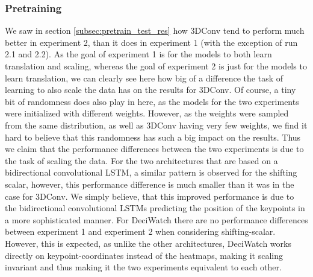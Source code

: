 \documentclass[./main.tex]{subfiles}
\begin{document}
\subsubsection{Pretraining}
We saw in section \ref{subsec:pretrain_test_res} how 3DConv tend to perform much better in experiment 2, than it does in experiment 1 (with the exception of run 2.1 and 2.2). As the goal of experiment 1 is for the models to both learn translation and scaling, whereas the goal of experiment 2 is just for the models to learn translation, we can clearly see here how big of a difference the task of learning to also scale the data has on the results for 3DConv. Of course, a tiny bit of randomness does also play in here, as the models for the two experiments were initialized with different weights. However, as the weights were sampled from the same distribution, as well as 3DConv having very few weights, we find it hard to believe that this randomness has such a big impact on the results. Thus we claim that the performance differences between the two experiments is due to the task of scaling the data. For the two architectures that are based on a bidirectional convolutional LSTM, a similar pattern is observed for the shifting scalar, however, this performance difference is much smaller than it was in the case for 3DConv. We simply believe, that this improved performance is due to the bidirectional convolutional LSTMs predicting the position of the keypoints in a more sophisticated manner. For DeciWatch there are no performance differences between experiment 1 and experiment 2 when considering shifting-scalar. However, this is expected, as unlike the other architectures, DeciWatch works directly on keypoint-coordinates instead of the heatmaps, making it scaling invariant and thus making it the two experiments equivalent to each other. 
\\
\\
\end{document}
